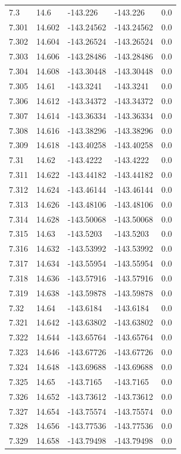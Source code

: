 \begin{tabular}{lllll}
7.3 & 14.6 & -143.226 & -143.226 & 0.0 \\
7.301 & 14.602 & -143.24562 & -143.24562 & 0.0 \\
7.302 & 14.604 & -143.26524 & -143.26524 & 0.0 \\
7.303 & 14.606 & -143.28486 & -143.28486 & 0.0 \\
7.304 & 14.608 & -143.30448 & -143.30448 & 0.0 \\
7.305 & 14.61 & -143.3241 & -143.3241 & 0.0 \\
7.306 & 14.612 & -143.34372 & -143.34372 & 0.0 \\
7.307 & 14.614 & -143.36334 & -143.36334 & 0.0 \\
7.308 & 14.616 & -143.38296 & -143.38296 & 0.0 \\
7.309 & 14.618 & -143.40258 & -143.40258 & 0.0 \\
7.31 & 14.62 & -143.4222 & -143.4222 & 0.0 \\
7.311 & 14.622 & -143.44182 & -143.44182 & 0.0 \\
7.312 & 14.624 & -143.46144 & -143.46144 & 0.0 \\
7.313 & 14.626 & -143.48106 & -143.48106 & 0.0 \\
7.314 & 14.628 & -143.50068 & -143.50068 & 0.0 \\
7.315 & 14.63 & -143.5203 & -143.5203 & 0.0 \\
7.316 & 14.632 & -143.53992 & -143.53992 & 0.0 \\
7.317 & 14.634 & -143.55954 & -143.55954 & 0.0 \\
7.318 & 14.636 & -143.57916 & -143.57916 & 0.0 \\
7.319 & 14.638 & -143.59878 & -143.59878 & 0.0 \\
7.32 & 14.64 & -143.6184 & -143.6184 & 0.0 \\
7.321 & 14.642 & -143.63802 & -143.63802 & 0.0 \\
7.322 & 14.644 & -143.65764 & -143.65764 & 0.0 \\
7.323 & 14.646 & -143.67726 & -143.67726 & 0.0 \\
7.324 & 14.648 & -143.69688 & -143.69688 & 0.0 \\
7.325 & 14.65 & -143.7165 & -143.7165 & 0.0 \\
7.326 & 14.652 & -143.73612 & -143.73612 & 0.0 \\
7.327 & 14.654 & -143.75574 & -143.75574 & 0.0 \\
7.328 & 14.656 & -143.77536 & -143.77536 & 0.0 \\
7.329 & 14.658 & -143.79498 & -143.79498 & 0.0 \\

\end{tabular}
